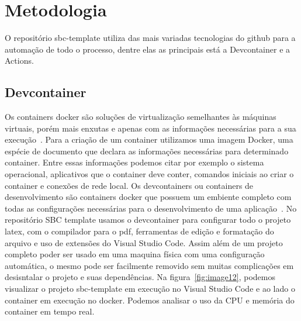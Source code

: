 \section{Metodologia}

O repositório sbc-template utiliza das mais variadas tecnologias do github para a automação de todo o processo, dentre elas as principais está a Devcontainer e a Actions.

\subsection{Devcontainer}
Os containers docker são soluções de virtualização semelhantes às máquinas virtuais, porém mais enxutas e apenas com as informações necessárias para a sua execução~\cite{vitalino:01}. Para a criação de um container utilizamos uma imagem Docker, uma espécie de documento que declara as informações necessárias para determinado container. Entre essas informações podemos citar por exemplo o sistema operacional, aplicativos que o container deve conter, comandos iniciais ao criar o container e conexões de rede local.
Os devcontainers ou containers de desenvolvimento são containers docker que possuem um embiente completo com todas as configurações necessárias para o desenvolvimento de uma aplicação~\cite{github:01}. No repositório SBC template usamos o devcontainer para configurar todo o projeto latex, com o compilador para o pdf, ferramentas de edição e formatação do arquivo e uso de extensões do Visual Studio Code. Assim além de um projeto completo poder ser usado em uma maquina física com uma configuração automática, o mesmo pode ser facilmente removido sem muitas complicações em desisntalar o projeto e suas dependências.
Na figura~\ref{fig:image12}, podemos visualizar o projeto sbc-template em execução no Visual Studio Code e ao lado o container em execução no docker. Podemos analisar o uso da CPU e memória do container em tempo real.

